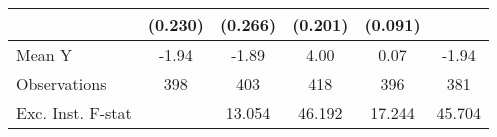 {\begin{tabular}{l*{5}{c}}
            &     (0.230)         &     (0.266)         &     (0.201)         &     (0.091)         &                     \\
\midrule
Mean Y      &       -1.94         &       -1.89         &        4.00         &        0.07         &       -1.94         \\
Observations&         398         &         403         &         418         &         396         &         381         \\
Exc. Inst. F-stat&                     &      13.054         &      46.192         &      17.244         &      45.704         \\
\bottomrule
\end{tabular}
}
